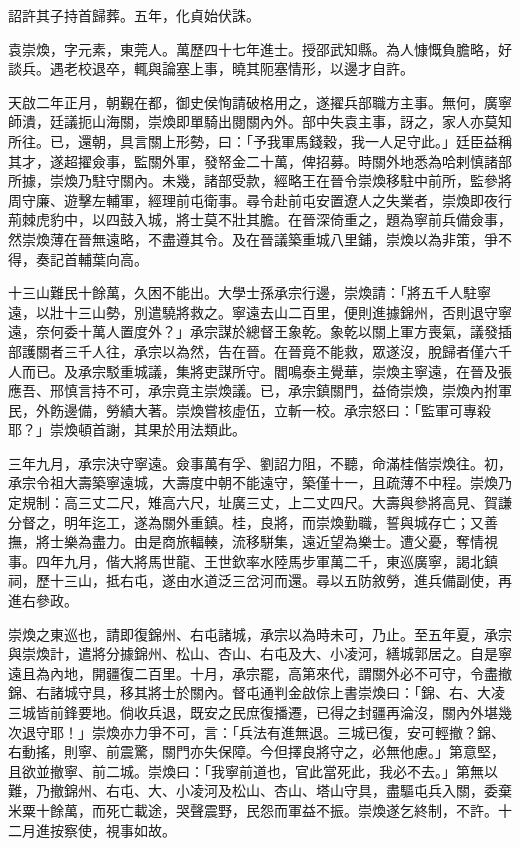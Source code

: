 \begin{pinyinscope}
詔許其子持首歸葬。五年，化貞始伏誅。

袁崇煥，字元素，東莞人。萬歷四十七年進士。授邵武知縣。為人慷慨負膽略，好談兵。遇老校退卒，輒與論塞上事，曉其阨塞情形，以邊才自許。

天啟二年正月，朝覲在都，御史侯恂請破格用之，遂擢兵部職方主事。無何，廣寧師潰，廷議扼山海關，崇煥即單騎出閱關內外。部中失袁主事，訝之，家人亦莫知所往。已，還朝，具言關上形勢，曰：「予我軍馬錢穀，我一人足守此。」廷臣益稱其才，遂超擢僉事，監關外軍，發帑金二十萬，俾招募。時關外地悉為哈剌慎諸部所據，崇煥乃駐守關內。未幾，諸部受款，經略王在晉令崇煥移駐中前所，監參將周守廉、遊擊左輔軍，經理前屯衛事。尋令赴前屯安置遼人之失業者，崇煥即夜行荊棘虎豹中，以四鼓入城，將士莫不壯其膽。在晉深倚重之，題為寧前兵備僉事，然崇煥薄在晉無遠略，不盡遵其令。及在晉議築重城八里鋪，崇煥以為非策，爭不得，奏記首輔葉向高。

十三山難民十餘萬，久困不能出。大學士孫承宗行邊，崇煥請：「將五千人駐寧遠，以壯十三山勢，別遣驍將救之。寧遠去山二百里，便則進據錦州，否則退守寧遠，奈何委十萬人置度外？」承宗謀於總督王象乾。象乾以關上軍方喪氣，議發插部護關者三千人往，承宗以為然，告在晉。在晉竟不能救，眾遂沒，脫歸者僅六千人而已。及承宗駁重城議，集將吏謀所守。閻鳴泰主覺華，崇煥主寧遠，在晉及張應吾、邢慎言持不可，承宗竟主崇煥議。已，承宗鎮關門，益倚崇煥，崇煥內拊軍民，外飭邊備，勞績大著。崇煥嘗核虛伍，立斬一校。承宗怒曰：「監軍可專殺耶？」崇煥頓首謝，其果於用法類此。

三年九月，承宗決守寧遠。僉事萬有孚、劉詔力阻，不聽，命滿桂偕崇煥往。初，承宗令祖大壽築寧遠城，大壽度中朝不能遠守，築僅十一，且疏薄不中程。崇煥乃定規制：高三丈二尺，雉高六尺，址廣三丈，上二丈四尺。大壽與參將高見、賀謙分督之，明年迄工，遂為關外重鎮。桂，良將，而崇煥勤職，誓與城存亡；又善撫，將士樂為盡力。由是商旅輻輳，流移駢集，遠近望為樂士。遭父憂，奪情視事。四年九月，偕大將馬世龍、王世欽率水陸馬步軍萬二千，東巡廣寧，謁北鎮祠，歷十三山，抵右屯，遂由水道泛三岔河而還。尋以五防敘勞，進兵備副使，再進右參政。

崇煥之東巡也，請即復錦州、右屯諸城，承宗以為時未可，乃止。至五年夏，承宗與崇煥計，遣將分據錦州、松山、杏山、右屯及大、小凌河，繕城郭居之。自是寧遠且為內地，開疆復二百里。十月，承宗罷，高第來代，謂關外必不可守，令盡撤錦、右諸城守具，移其將士於關內。督屯通判金啟倧上書崇煥曰：「錦、右、大凌三城皆前鋒要地。倘收兵退，既安之民庶復播遷，已得之封疆再淪沒，關內外堪幾次退守耶！」崇煥亦力爭不可，言：「兵法有進無退。三城已復，安可輕撤？錦、右動搖，則寧、前震驚，關門亦失保障。今但擇良將守之，必無他慮。」第意堅，且欲並撤寧、前二城。崇煥曰：「我寧前道也，官此當死此，我必不去。」第無以難，乃撤錦州、右屯、大、小凌河及松山、杏山、塔山守具，盡驅屯兵入關，委棄米粟十餘萬，而死亡載途，哭聲震野，民怨而軍益不振。崇煥遂乞終制，不許。十二月進按察使，視事如故。


\end{pinyinscope}
